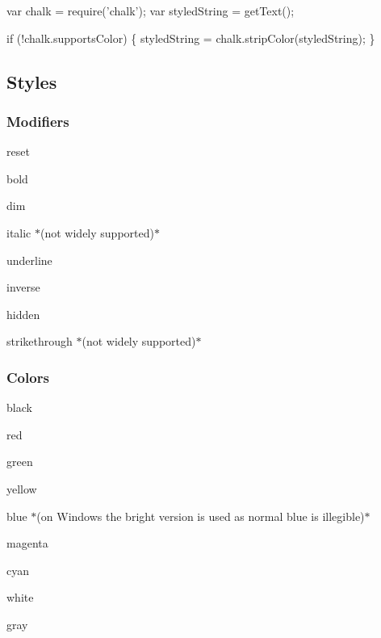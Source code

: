 \begin{DoxyCode}
var chalk = require(\textcolor{stringliteral}{'chalk'});
var styledString = getText();

\textcolor{keywordflow}{if} (!chalk.supportsColor) \{
    styledString = chalk.stripColor(styledString);
\}
\end{DoxyCode}


\subsection*{Styles}

\subsubsection*{Modifiers}


\begin{DoxyItemize}
\item {\ttfamily reset}
\item {\ttfamily bold}
\item {\ttfamily dim}
\item {\ttfamily italic} $\ast$(not widely supported)$\ast$
\item {\ttfamily underline}
\item {\ttfamily inverse}
\item {\ttfamily hidden}
\item {\ttfamily strikethrough} $\ast$(not widely supported)$\ast$
\end{DoxyItemize}

\subsubsection*{Colors}


\begin{DoxyItemize}
\item {\ttfamily black}
\item {\ttfamily red}
\item {\ttfamily green}
\item {\ttfamily yellow}
\item {\ttfamily blue} $\ast$(on Windows the bright version is used as normal blue is illegible)$\ast$
\item {\ttfamily magenta}
\item {\ttfamily cyan}
\item {\ttfamily white}
\item {\ttfamily gray}
\end{DoxyItemize}

